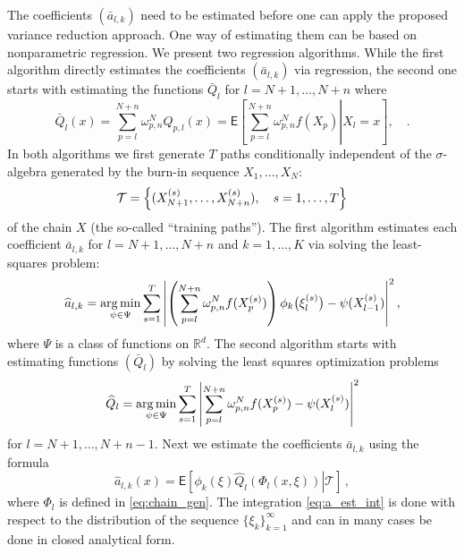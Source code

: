 \documentclass[article]{elsarticle}
\def\NtrainPath{T}
\def\TrainSet{\mathcal{T}}
\newcommand*{\argmin}{\operatornamewithlimits{arg\,min}}
\begin{document}
The coefficients \((\bar a_{l,k})\) need to be estimated before one can apply the proposed variance reduction approach. One way of estimating them can be based on nonparametric regression.
We present two regression algorithms. While the first algorithm directly estimates  the coefficients \((\bar a_{l,k})\) via regression, the second one starts with estimating the functions $\bar{Q}_{l}$ for $l=N+1,\ldots,N+n$ where
\begin{equation*}
\bar{Q}_{l}(x)=\sum_{p=l}^{N+n} \omega_{p,n}^{N} Q_{p,l}\left(x\right)=\mathsf{E}\left[\left.\sum_{p=l}^{N+n}\omega_{p,n}^{N}f(X_{p})\right|X_{l}=x\right],\quad .
\end{equation*}
In both algorithms we first generate \(\NtrainPath\)  paths conditionally independent of the $\sigma$-algebra generated by the burn-in sequence $X_1,\dots,X_N$:
\[
\TrainSet=\Bigl\{(X^{(s)}_{N+1},\ldots,X^{(s)}_{N+n}),\quad s=1,\ldots,\NtrainPath\Bigr\}
\]
of the chain \(X\)
(the so-called ``training paths'').
The first algorithm estimates each coefficient \(\bar a_{l,k}\) for $l=N+1,\dots, N+n$  and $k=1,\dots,K$  via solving the least-squares problem:
\begin{equation}\label{eq:est_a_direct}
\widehat a_{l,k}=\argmin_{\psi\in \Psi}\sum_{s=1}^{\NtrainPath} \left | \left(\sum_{p=l}^{N+n}\omega_{p,n}^{N}f(X^{(s)}_{p})\right)\phi_k\bigl(\xi^{(s)}_{l}\bigr)-\psi(X^{(s)}_{l-1})\right|^2,
\end{equation}
where \(\Psi\) is a  class of  functions on \(\mathbb{R}^d.\)
The second algorithm starts with estimating  functions \((\bar Q_{l})\) by solving  the least squares optimization problems
\begin{equation}\label{eq:06042018a1}
{\widehat  Q}_{l}=\argmin_{\psi\in \Psi}\sum_{s=1}^{\NtrainPath} \left | \sum_{p=l}^{N+n}\omega_{p,n}^{N}f(X^{(s)}_{p})-\psi(X^{(s)}_{l})\right|^2
\end{equation}
for \(l=N+1,\ldots, N+n-1.\)
Next  we estimate the coefficients \( \bar a_{l,k}\) using
the formula
\begin{equation}
\label{eq:a_est_int}
\widehat a_{l,k}(x)=\mathsf{E}\left[\left.\phi_k\left(\xi\right)\widehat Q_{l}\left(\Phi_l(x,\xi)\right)\right | \TrainSet\right] \,,
\end{equation}
where $\Phi_l$ is defined in \eqref{eq:chain_gen}. The integration \eqref{eq:a_est_int} is done with respect to the distribution of the sequence $\{\xi_k\}_{k=1}^\infty$ and can in many cases be done in closed analytical form.
\end{document}
